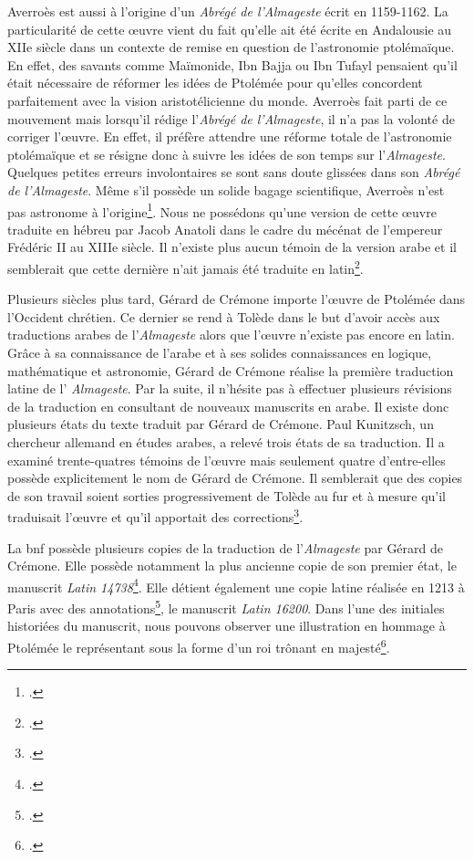 Averroès est aussi à l'origine d'un \textit{Abrégé de l'Almageste} écrit en 1159-1162. La particularité de cette œuvre vient du fait qu'elle ait été écrite en Andalousie au XIIe siècle dans un contexte de remise en question de l'astronomie ptolémaïque. En effet, des savants comme Maïmonide, Ibn Bajja ou Ibn Tufayl pensaient qu'il était nécessaire de réformer les idées de Ptolémée pour qu'elles concordent parfaitement avec la vision aristotélicienne du monde. Averroès fait parti de ce mouvement mais lorsqu'il rédige l'\textit{Abrégé de l'Almageste}, il n'a pas la volonté de corriger l'œuvre. En effet, il préfère attendre une réforme totale de l'astronomie ptolémaïque et se résigne donc à suivre les idées de son temps sur l'\textit{Almageste}.
Quelques petites erreurs involontaires se sont sans doute glissées dans son \textit{Abrégé de l'Almageste}. Même s'il possède un solide bagage scientifique, Averroès n'est pas astronome à l'origine\footcite{layAverroesAbregeDastronomie1998}. Nous ne possédons qu'une version de cette œuvre traduite en hébreu par Jacob Anatoli dans le cadre du mécénat de l'empereur Frédéric II au XIIIe siècle. Il n'existe plus aucun témoin de la version arabe et il semblerait que cette dernière n'ait jamais été traduite en latin\footcite{layAverroesHebraicusInedit2005}.

Plusieurs siècles plus tard, Gérard de Crémone importe l'œuvre de Ptolémée dans l'Occident chrétien. 
Ce dernier se rend à Tolède dans le but d'avoir accès aux traductions arabes de l'\textit{Almageste} alors que l'œuvre n'existe pas encore en latin. Grâce à sa connaissance de l'arabe et à ses solides connaissances en logique, mathématique et astronomie, Gérard de Crémone réalise la première traduction latine de l' \textit{Almageste}. Par la suite, il n'hésite pas à effectuer plusieurs révisions de la traduction en consultant de nouveaux manuscrits en arabe. Il existe donc plusieurs états du texte traduit par Gérard de Crémone. Paul Kunitzsch, un chercheur allemand en études arabes, a relevé trois états de sa traduction. Il a examiné trente-quatres témoins de l'œuvre mais seulement quatre d'entre-elles possède explicitement le nom de Gérard de Crémone. Il semblerait que des copies de son travail soient sorties progressivement de Tolède au fur et à mesure qu'il traduisait l'œuvre et qu'il apportait des corrections\footcite{jacquartTraductionsAuFil2018}.

La \gls{bnf} possède plusieurs copies de la traduction de l'\textit{Almageste} par Gérard de Crémone. Elle possède notamment la plus ancienne copie de son premier état, le manuscrit \textit{Latin 14738}\footcite{jacquartTraductionsAuFil2018}. Elle détient également une copie latine réalisée en 1213 à Paris avec des annotations\footcite{ptolemaeusPtolomeusAlmagestumTransl1213}, le manuscrit \textit{Latin 16200}. 
Dans l'une des initiales historiées du manuscrit, nous pouvons observer une illustration en hommage  à Ptolémée le représentant sous la forme d'un roi trônant en majesté\footcite{TraductionLatineLAlmageste}. 


